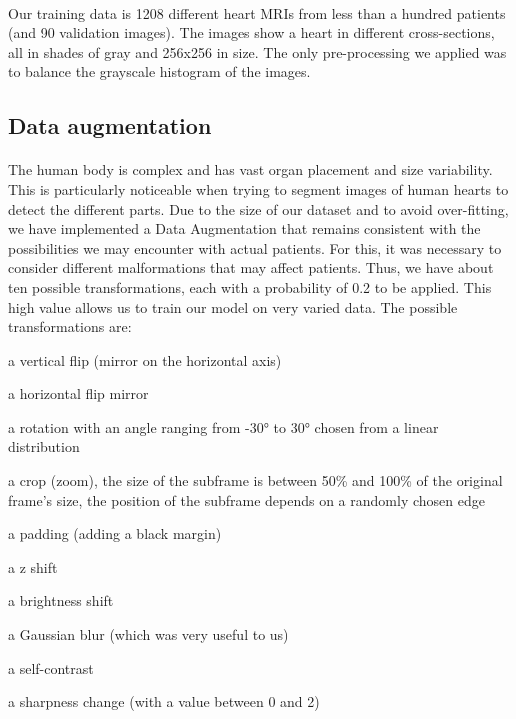 \documentclass[english]{article}
\begin{document}
\paragraph{}
Our training data is 1208 different heart MRIs from less than a hundred patients (and 90 validation images). The images show a heart in different cross-sections, all in shades of gray and 256x256 in size.
The only pre-processing we applied was to balance the grayscale histogram of the images.

\subsection{Data augmentation}
\paragraph{}
The human body is complex and has vast organ placement and size variability.
This is particularly noticeable when trying to segment images of human hearts to detect the different parts. Due to the size of our dataset and to avoid over-fitting, we have implemented a Data Augmentation that remains consistent with the possibilities we may encounter with actual patients.
For this, it was necessary to consider different malformations that may affect patients. Thus, we have about ten possible transformations, each with a probability of 0.2 to be applied. This high value allows us to train our model on very varied data.
The possible transformations are:

\begin{list}{\textbullet}{}
    \item a vertical flip (mirror on the horizontal axis)
    \item a horizontal flip mirror
    \item a rotation with an angle ranging from -30° to 30° chosen from a linear distribution
    \item a crop (zoom), the size of the subframe is between 50\% and 100\% of the original frame's size, the position of the subframe depends on a randomly chosen edge
    \item a padding (adding a black margin)
    \item a z shift
    \item a brightness shift
    \item a Gaussian blur (which was very useful to us)
    \item a self-contrast
    \item a sharpness change (with a value between 0 and 2)
\end{list}
\end{document}
